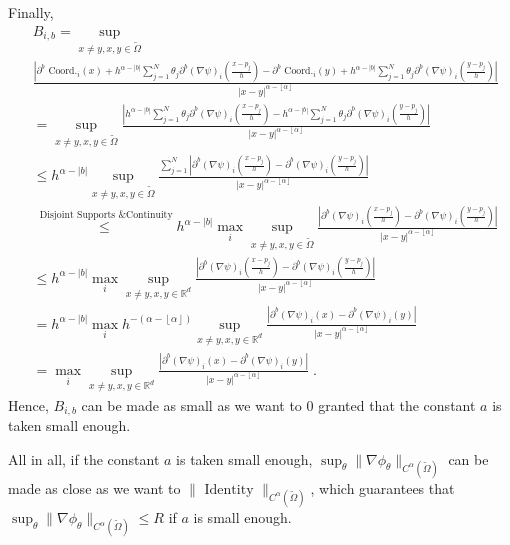 \documentclass{article}
\theoremstyle{plain}
\theoremstyle{definition}
\theoremstyle{remark}
\newcommand{\R}[0]{\mathbb{R}}
\newcommand\p[1]{\left( {#1}\right)}
\newcommand\floor[1]{\left\lfloor {#1}\right\rfloor}
\begin{document}
\begin{itemize}
    Finally, 
    \begin{equation}
        \begin{aligned}
            &B_{i, b} = \sup_{x \neq y, x, y \in \tilde{\Omega}}\\
            &\frac{\left|\partial^b \text{ Coord.}_i(x) + h^{\alpha - |b|} \sum_{j = 1}^{N} \theta_j \partial^b (\nabla \psi)_i \p{\frac{x - p_j}{h}} - \partial^b \text{ Coord.}_i(y) + h^{\alpha - |b|} \sum_{j = 1}^{N} \theta_j \partial^b (\nabla \psi)_i \p{\frac{y - p_j}{h}} \right|}{|x - y|^{\alpha - \floor{\alpha}}} \\
        &= \sup_{x \neq y, x, y \in \tilde{\Omega}}
        \frac{\left|h^{\alpha - |b|} \sum_{j = 1}^{N} \theta_j \partial^b (\nabla \psi)_i \p{\frac{x - p_j}{h}} - h^{\alpha - |b|} \sum_{j = 1}^{N} \theta_j \partial^b (\nabla \psi)_i \p{\frac{y - p_j}{h}} \right|}{|x - y|^{\alpha - \floor{\alpha}}} \\
        &\leq 
        h^{\alpha - |b|}
        \sup_{x \neq y, x, y \in \tilde{\Omega}}
        \frac{ \sum_{j = 1}^{N} \left|\partial^b (\nabla \psi)_i \p{\frac{x - p_j}{h}} -   \partial^b (\nabla \psi)_i \p{\frac{y - p_j}{h}} \right|}{|x - y|^{\alpha - \floor{\alpha}}} \\
        &\stackrel{\text{ Disjoint Supports \& Continuity}}{\leq}
        h^{\alpha - |b|}
         \max_i \sup_{x \neq y, x, y \in \tilde{\Omega}}
        \frac{  \left|\partial^b (\nabla \psi)_i \p{\frac{x - p_j}{h}} -   \partial^b (\nabla \psi)_i \p{\frac{y - p_j}{h}} \right|}{|x - y|^{\alpha - \floor{\alpha}}} \\
        &\leq
        h^{\alpha - |b|}
         \max_i \sup_{x \neq y, x, y \in \R^d}
        \frac{  \left|\partial^b (\nabla \psi)_i \p{\frac{x - p_j}{h}} -   \partial^b (\nabla \psi)_i \p{\frac{y - p_j}{h}} \right|}{|x - y|^{\alpha - \floor{\alpha}}} \\
        &= 
        h^{\alpha - |b|}
         \max_i h^{-(\alpha - \floor{\alpha})} \sup_{x \neq y, x, y \in \R^d}
        \frac{  \left|\partial^b (\nabla \psi)_i \p{x} -   \partial^b (\nabla \psi)_i \p{y} \right|}{|x - y|^{\alpha - \floor{\alpha}}} \\
        &= 
         \max_i\sup_{x \neq y, x, y \in \R^d}
        \frac{  \left|\partial^b (\nabla \psi)_i \p{x} -   \partial^b (\nabla \psi)_i \p{y} \right|}{|x - y|^{\alpha - \floor{\alpha}}} \;.
        \end{aligned}
    \end{equation}
    Hence, $B_{i, b}$ can be made as small as we want to $0$ granted that the constant $a$ is taken small enough.

    All in all, if the constant $a$ is taken small enough, $\sup_{\theta} \| \nabla \phi_{\theta} \|_{C^{\alpha}(\tilde{\Omega})}$ can be made as close as we want to $\| \text{ Identity } \|_{C^{\alpha}(\tilde{\Omega})}$, which guarantees that $\sup_{\theta} \| \nabla \phi_{\theta} \|_{C^{\alpha}(\tilde{\Omega})} \leq R$ if $a$ is small enough.
\end{itemize}
\end{document}
